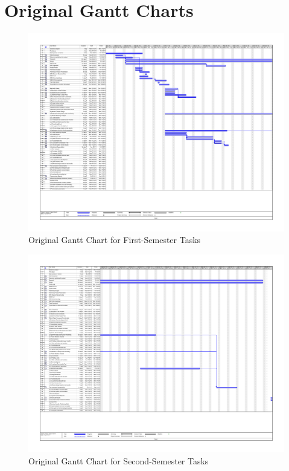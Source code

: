 \section{Original Gantt Charts}
\label{sec:gantt_charts_appendix}
\begin{figure}[htbp]
\begin{center}
  \includegraphics[angle=90,width=6in]{includes/Gantt_semester_1.pdf}
  \caption{Original Gantt Chart for First-Semester Tasks}
  \label{fig:gantt_sem_1}
\end{center}
\end{figure}

\begin{figure}[htbp]
\begin{center}
  \includegraphics[angle=90,width=6.5in]{includes/Gantt_semester_2.pdf}
  \caption{Original Gantt Chart for Second-Semester Tasks}
  \label{fig:gantt_sem_2}
\end{center}
\end{figure}